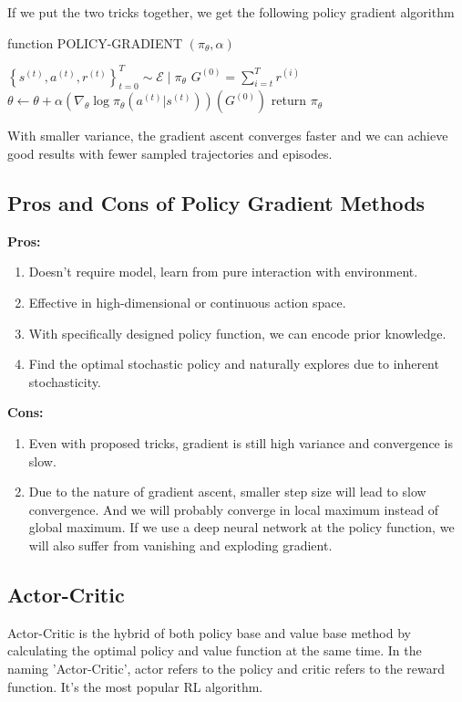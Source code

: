 \documentclass[11pt]{article}
\begin{document}
If we put the two tricks together, we get the following policy gradient algorithm
\begin{algorithm}
\caption{function POLICY-GRADIENT $\left(\pi_{\theta}, \alpha\right)$}\label{alg:cap}
\begin{algorithmic}
\STATE $\left\{s^{(t)}, a^{(t)}, r^{(t)}\right\}_{t=0}^{T} \sim \mathcal{E} \mid \pi_{\theta}$
\STATE $G^{(0)}=\sum_{i=t}^{T} r^{(i)}$
\STATE $\theta \leftarrow \theta+\alpha\left(\nabla_{\theta} \log \pi_{\theta}\left(a^{(t)} | s^{(t)}\right)\right)\left(G^{(0)}\right)$
\ENDFOR
\ENDFOR
\STATE return $\pi_{\theta}$
\end{algorithmic}
\end{algorithm}
With smaller variance, the gradient ascent converges faster and we can achieve good results with fewer sampled trajectories and episodes.

\subsection{Pros and Cons of Policy Gradient Methods}
\textbf{Pros:}
\begin{enumerate}
    \item Doesn't require model, learn from pure interaction with environment.
    \item Effective in high-dimensional or continuous action space.
    \item With specifically designed policy function, we can encode prior knowledge.
    \item Find the optimal stochastic policy and naturally explores due to inherent stochasticity. 
\end{enumerate}
\textbf{Cons:}
\begin{enumerate}
    \item Even with proposed tricks, gradient is still high variance and convergence is slow.
    \item Due to the nature of gradient ascent, smaller step size will lead to slow convergence. And we will probably converge in local maximum instead of global maximum. If we use a deep neural network at the policy function, we will also suffer from vanishing and exploding gradient.
\end{enumerate}
\subsection{Actor-Critic}
Actor-Critic is the hybrid of both policy base and value base method by calculating the optimal policy and value function at the same time. In the naming 'Actor-Critic', actor refers to the policy and critic refers to the reward function. It's the most popular RL algorithm.
\end{document}
